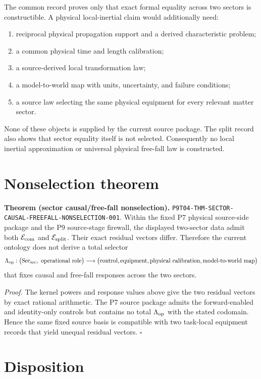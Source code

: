 \documentclass[11pt]{article}
\newcommand{\Sec}{\operatorname{Sec}_{\rm src}}
\begin{document}
The common record proves only that exact formal equality across two sectors
is constructible.  A physical local-inertial claim would additionally need:
\begin{enumerate}
  \item reciprocal physical propagation support and a derived characteristic
        problem;
  \item a common physical time and length calibration;
  \item a source-derived local transformation law;
  \item a model-to-world map with units, uncertainty, and failure conditions;
  \item a source law selecting the same physical equipment for every relevant
        matter sector.
\end{enumerate}
None of these objects is supplied by the current source package.  The split
record also shows that sector equality itself is not selected.  Consequently
no local inertial approximation or universal physical free-fall law is
constructed.

\section{Nonselection theorem}

\textbf{Theorem (sector causal/free-fall nonselection).}
\nolinkurl{P9T04-THM-SECTOR-CAUSAL-FREEFALL-NONSELECTION-001}.
Within the fixed P7 physical source-side package and the P9 source-stage
firewall, the displayed two-sector data admit both
\(\mathcal E_{\rm com}\) and \(\mathcal E_{\rm split}\).  Their exact residual
vectors differ.  Therefore the current ontology does not derive a total
selector
\[
 \Lambda_{\rm op}:
 \bigl(\Sec,\text{ operational role}\bigr)
 \longrightarrow
 \bigl(\text{control},\text{equipment},
       \text{physical calibration},\text{model-to-world map}\bigr)
\]
that fixes causal and free-fall responses across the two sectors.

\textit{Proof.}
The kernel powers and response values above give the two residual vectors by
exact rational arithmetic.  The P7 source package admits the forward-enabled
and identity-only controls but contains no total \(\Lambda_{\rm op}\) with
the stated codomain.  Hence the same fixed source basis is compatible with
two task-local equipment records that yield unequal residual vectors.
\(\square\)

\section{Disposition}
\end{document}
